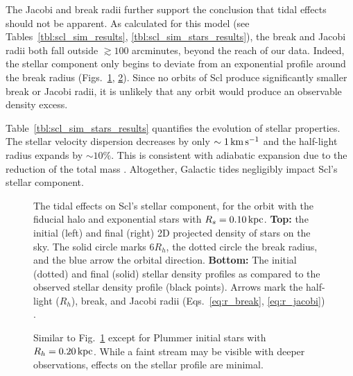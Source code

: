The Jacobi and break radii further support the conclusion that tidal
effects should not be apparent. As calculated for this model (see
Tables~\ref{tbl:scl_sim_results}, \ref{tbl:scl_sim_stars_results}), the
break and Jacobi radii both fall outside \(\gtrsim 100\) arcminutes,
beyond the reach of our data. Indeed, the stellar component only begins
to deviate from an exponential profile around the break radius
(Figs.~\ref{fig:scl_smallperi_i_f}, \ref{fig:scl_smallperi_plummer_i_f}).
Since no orbits of Scl produce significantly smaller break or Jacobi
radii, it is unlikely that any orbit would produce an observable density
excess.

Table~\ref{tbl:scl_sim_stars_results} quantifies the evolution of
stellar properties. The stellar velocity dispersion decreases by only
\(\sim1\,{\rm km\,s^{-1}}\) and the half-light radius expands by \(\sim 10\%\). This
is consistent with adiabatic expansion due to the reduction of the total
mass \citep[e.g.,][]{stucker+2023}. Altogether, Galactic tides
negligibly impact Scl's stellar component.

\begin{figure}
\centering
{}
\caption[Sculptor initial and final density profiles]{The tidal effects
on Scl's stellar component, for the \smallperi{} orbit with the fiducial
halo and exponential stars with \(R_s=0.10\,{\rm kpc}\). \textbf{Top:} the
initial (left) and final (right) 2D projected density of stars on the
sky. The solid circle marks \(6R_h\), the dotted circle the break
radius, and the blue arrow the orbital direction. \textbf{Bottom:} The
initial (dotted) and final (solid) stellar density profiles as compared
to the observed stellar density profile (black points). Arrows mark the
half-light (\(R_h\)), break, and Jacobi radii
(Eqs.~\ref{eq:r_break}, \ref{eq:r_jacobi})
.}\label{fig:scl_smallperi_i_f}
\end{figure}

\begin{figure}
\centering
{}
\caption[Sculptor Plummer initial and final density profiles]{Similar to
Fig.~\ref{fig:scl_smallperi_i_f} except for Plummer initial stars with
\(R_h = 0.20\,{\rm kpc}\). While a faint stream may be visible with deeper
observations, effects on the stellar profile are
minimal.}\label{fig:scl_smallperi_plummer_i_f}
\end{figure}

